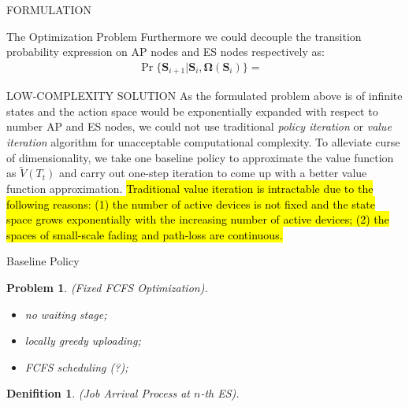 \documentclass[10pt, conference, letterpaper]{IEEEtran}
\newtheorem{definition}{Denifition}
\newtheorem{problem}{Problem}
\newcommand{\Stat}{\mathbf{S}}
\newcommand{\Policy}{\mathbf{\Omega}}
\begin{document}
\begin{section}{FORMULATION}
\begin{subsection}{The Optimization Problem}
            Furthermore we could decouple the transition probability expression on AP nodes and ES nodes respectively as:
            \begin{align}
                \Pr\{\Stat_{i+1}|\Stat_{i}, \Policy(\Stat_{i})\} =& 
            \end{align}
        \end{subsection}
    \end{section}

    \begin{section}{LOW-COMPLEXITY SOLUTION}
        \label{sec:algorithm}
        As the formulated problem above is of infinite states and the action space would be exponentially expanded with respect to number AP and ES nodes, we could not use traditional \emph{policy iteration} or \emph{value iteration} algorithm \cite{sutton1998introduction} for unacceptable computational complexity. To alleviate curse of dimensionality, we take one baseline policy to approximate the value function as $\tilde{V}(T_t)$ and carry out one-step iteration to come up with a better value function approximation.
        \hl{Traditional value iteration is intractable due to the following reasons: (1) the number of active devices is not fixed and the state space grows exponentially with the increasing number of active devices; (2) the spaces of small-scale fading and path-loss are continuous.}

        \begin{subsection}{Baseline Policy}
            \begin{problem}
                (Fixed FCFS Optimization).
                \begin{itemize}
                    \item no waiting stage;
                    \item locally greedy uploading;
                    \item FCFS scheduling (?);
                \end{itemize}
            \end{problem}

            \begin{definition}
                (Job Arrival Process at $n$-th ES).
            \end{definition}


\end{subsection}
\end{section}
\end{document}
